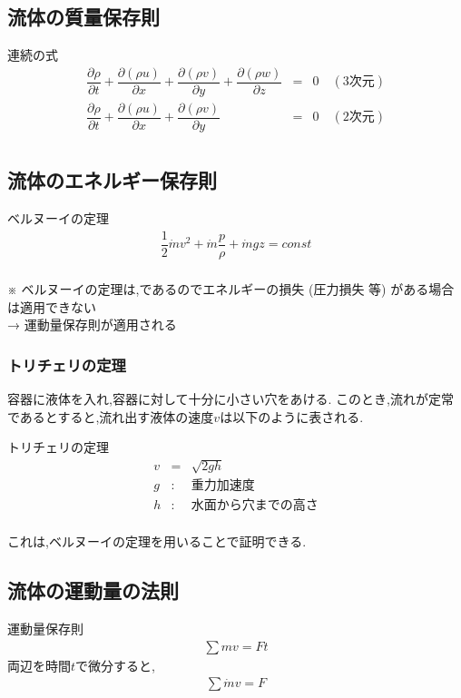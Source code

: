 \documentclass[a4paper]{jsarticle}
\begin{document}
\subsection{流体の質量保存則}
\begin{itembox}[l]{連続の式}
    \begin{eqnarray*}
        \dfrac{\partial\rho}{\partial t}+\dfrac{\partial \left(\rho u\right)}{\partial x}+\dfrac{\partial \left(\rho v\right)}{\partial y}+\dfrac{\partial \left(\rho w\right)}{\partial z}&=&0\quad(3次元)\\
        \dfrac{\partial\rho}{\partial t}+\dfrac{\partial \left(\rho u\right)}{\partial x}+\dfrac{\partial \left(\rho v\right)}{\partial y}&=&0\quad(2次元)\\
    \end{eqnarray*}
\end{itembox}
\subsection{流体のエネルギー保存則}
\begin{itembox}[l]{ベルヌーイの定理}
    \begin{eqnarray*}
        \dfrac{1}{2}\dot{m}v^2+\dot{m}\dfrac{p}{\rho}+\dot{m}gz=const\\
    \end{eqnarray*}
\end{itembox}
※ ベルヌーイの定理は,であるのでエネルギーの損失 (圧力損失 等) がある場合は適用できない\\
→ 運動量保存則が適用される
\subsubsection{トリチェリの定理}
容器に液体を入れ,容器に対して十分に小さい穴をあける.
このとき,流れが定常であるとすると,流れ出す液体の速度$v$は以下のように表される.
\begin{itembox}[l]{トリチェリの定理}
    \begin{eqnarray*}
        v&=&\sqrt{2gh}\\
        g&:&重力加速度\\
        h&:&水面から穴までの高さ\\
    \end{eqnarray*}
\end{itembox}
これは,ベルヌーイの定理を用いることで証明できる.
\subsection{流体の運動量の法則}
\begin{itembox}[l]{運動量保存則}
    \begin{eqnarray*}
        \displaystyle\sum mv=Ft
    \end{eqnarray*}
    両辺を時間$t$で微分すると,
    \begin{eqnarray*}
        \displaystyle\sum \dot{m}v=F\\
    \end{eqnarray*}
\end{itembox}
\end{document}
